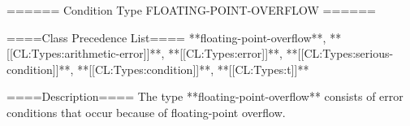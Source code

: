 ====== Condition Type FLOATING-POINT-OVERFLOW ======

====Class Precedence List==== 
**floating-point-overflow**, **[[CL:Types:arithmetic-error]]**, **[[CL:Types:error]]**, **[[CL:Types:serious-condition]]**, **[[CL:Types:condition]]**, **[[CL:Types:t]]**

====Description====
The type **floating-point-overflow** consists of error conditions that occur because of floating-point overflow.

